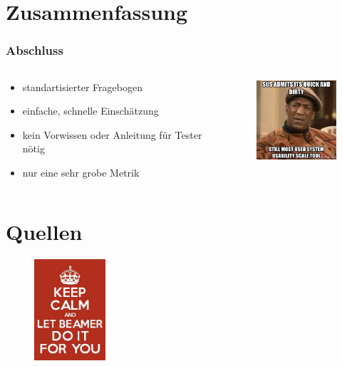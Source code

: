 \documentclass[12pt, aspectratio=169]{beamer}
\begin{document}
\section{Zusammenfassung}
\begin{frame}
	\frametitle{Abschluss}
	\begin{columns}
		\begin{column}{0.5\textwidth}
			\begin{itemize}
				\item <1> standartisierter Fragebogen
				\item <1> einfache, schnelle Einschätzung
				\item <1> kein Vorwissen oder Anleitung für Tester nötig
				\item <1> nur eine sehr grobe Metrik
			\end{itemize}
		\end{column}
		\begin{column}{0.5\textwidth}
			\begin{figure}
				\centering
				\includegraphics[keepaspectratio=true, width=125px]{./image/sus-meme.png}
				\caption{\tiny{\cite{sp1}}}
			\end{figure}
		\end{column}
	\end{columns}
\end{frame}

\section{Quellen}
\begin{frame}
    \nocite{*}
	\hfill
	\begin{figure}
		\includegraphics[keepaspectratio=true, width=100px]{./image/J3Nae.png}
	\end{figure}
    
    
\end{frame}
\end{document}

